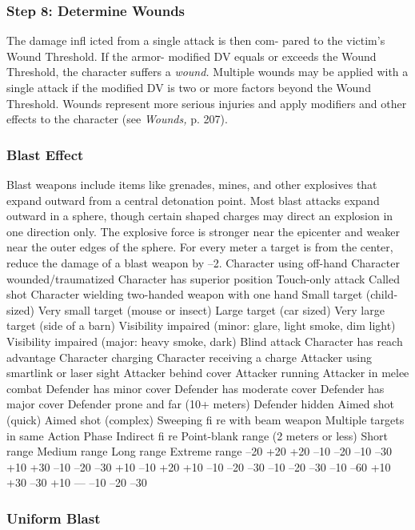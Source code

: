 \subsubsection{Step 8: Determine Wounds}

The damage infl icted from a single attack is then com-
pared to the victim's Wound Threshold. If the armor-
modified DV equals or exceeds the Wound Threshold, 
the character suffers a \textit{wound.} Multiple wounds may be 
applied with a single attack if the modified DV is two 
or more factors beyond the Wound Threshold. Wounds 
represent more serious injuries and apply modifiers and 
other effects to the character (see \textit{Wounds,} p. 207).

\subsubsection{Blast Effect}

Blast weapons include items like grenades, mines, and 
other explosives that expand outward from a central 
detonation point. Most blast attacks expand outward 
in a sphere, though certain shaped charges may direct 
an explosion in one direction only. The explosive force 
is stronger near the epicenter and weaker near the 
outer edges of the sphere. For every meter a target is 
from the center, reduce the damage of a blast weapon 
by –2.
Character using off-hand
Character wounded/traumatized
Character has superior position
Touch-only attack
Called shot
Character wielding two-handed weapon with one hand
Small target (child-sized)
Very small target (mouse or insect)
Large target (car sized)
Very large target (side of a barn)
Visibility impaired (minor: glare, light smoke, dim light)
Visibility impaired (major: heavy smoke, dark)
Blind attack
Character has reach advantage
Character charging
Character receiving a charge
Attacker using smartlink or laser sight
Attacker behind cover
Attacker running
Attacker in melee combat
Defender has minor cover
Defender has moderate cover
Defender has major cover
Defender prone and far (10+ meters)
Defender hidden
Aimed shot (quick)
Aimed shot (complex)
Sweeping ﬁ re with beam weapon
Multiple targets in same Action Phase
Indirect ﬁ re
Point-blank range (2 meters or less)
Short range
Medium range
Long range
Extreme range
–20
+20
+20
–10
–20
–10
–30
+10
+30
–10
–20
–30
+10
–10
+20
+10
–10
–20
–30
–10
–20
–30
–10
–60
+10
+30
–30
+10
—
–10
–20
–30

\subsubsection{Uniform Blast}

